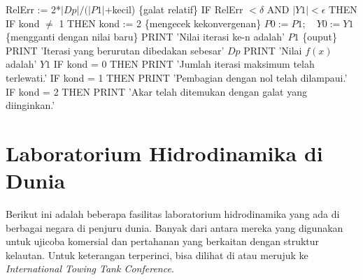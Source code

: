\documentclass[12pt,a4paper]{report}
\begin{document}
\hspace*{.2in} RelErr := 2*$|Dp|/(|P1|$+kecil) \quad \quad \{galat relatif\}%
\newline
\hspace*{.2in} IF RelErr $< \delta$ AND $|Y1|<\epsilon$ THEN \newline
\hspace*{.5in} IF kond $\neq$ 1 THEN kond := 2 \quad \quad \{mengecek kekonvergenan\} \newline 
\hspace*{.2in} $P0 := P1; \quad Y0 := Y1$ \quad \quad
\{mengganti dengan nilai baru\}\newline
\newline
PRINT 'Nilai iterasi ke-n adalah' $P1$ \quad \quad \{ouput\}\newline
PRINT 'Iterasi yang berurutan dibedakan sebesar' $Dp$ \newline
PRINT 'Nilai $f(x)$ adalah' $Y1$ \newline
IF kond = 0 THEN \newline
\hspace*{.2in} PRINT 'Jumlah iterasi maksimum telah terlewati.'\newline
IF kond = 1 THEN \newline
\hspace*{.2in} PRINT 'Pembagian dengan nol telah dilampaui.'\newline
IF kond = 2 THEN \newline
\hspace*{.2in} PRINT 'Akar telah ditemukan dengan galat yang diinginkan.'

\chapter{Laboratorium Hidrodinamika di Dunia}

Berikut ini adalah beberapa fasilitas laboratorium hidrodinamika
yang ada di berbagai negara di penjuru dunia. Banyak dari antara
mereka yang digunakan untuk ujicoba komersial dan pertahanan yang
berkaitan dengan struktur kelautan. Untuk keterangan terperinci,
bisa dilihat di \cite{csk} atau merujuk ke \textit{International
Towing Tank Conference}.
\end{document}
